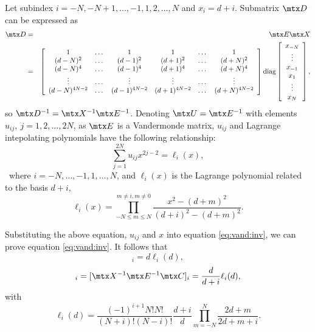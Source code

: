 Let subindex $i=-N,-N+1,\dots,-1,1,2,\dots,N$ and $x_i=d+i$.
Submatrix $\mtx D$ can be expressed as
\begin{eqnarray*}
\mtx D &=& \mtx E\mtx X \\
&=&
\left[\begin{array}{cccccc}
1 & \dots &1 &1 & \dots & 1 \\ 
(d-N)^2 & \dots & (d-1)^2 &(d+1)^2 & \dots & (d+N)^2 \\
(d-N)^4 & \dots & (d-1)^4 &(d+1)^4 & \dots & (d+N)^4 \\
\vdots & \dots & \vdots  & \vdots &\dots &\vdots \\
(d-N)^{4N-2} & \dots & (d-1)^{4N-2} & (d+1)^{4N-2} & \dots & (d+N)^{4N-2}
\end{array}\right]\textrm{diag}
\left[\begin{array}{c}
x_{-N}\\ \vdots \\ x_{-1} \\ x_1 \\ \vdots \\ x_N
\end{array}\right],
\end{eqnarray*}
so $\mtx D^{-1}=\mtx X^{-1}\mtx E^{-1}$.
Denoting $\mtx U=\mtx E^{-1}$ with elements $u_{ij},~j=1,2,\dots,2N$,
as $\mtx E$ is a Vandermonde matrix,
$u_{ij}$ and Lagrange intepolating polynomials have the following relationship:
\begin{equation}\label{eq:vand:inv}
\sum_{j=1}^{2N}u_{ij}x^{2j-2}=\ell_i(x),
\end{equation}\
where $i=-N,\dots,-1,1,\dots,N$, 
and $\ell_i(x)$ is the Lagrange polynomial related to the basis $d+i$,
\begin{equation}\label{eq:lag}
\ell_i(x)=
\prod_{-N\leq m\leq N}^{m\neq i,m\neq 0}
\frac{x^2-(d+m)^2}{(d+i)^2-(d+m)^2}.
\end{equation}

Substituting the above equation, $u_{ij}$ and $x$ 
into equation \ref{eq:vand:inv},
we can prove equation \ref{eq:vand:inv}.
It follows that
\begin{equation}
[\mtx E^{-1}\mtx C]_i=d\ell_i(d),
\end{equation}
\begin{equation}
[\mtx D^{-1}\mtx C]_i=
[\mtx X^{-1}\mtx E^{-1}\mtx C]_i=
\frac{d}{d+i}\ell_i(d),
\end{equation}
with
\begin{equation}
\ell_i(d)=\frac{(-1)^{i+1}N!N!}{(N+i)!(N-i)!}
\frac{d+i}{d}
\prod_{m=-N}^N \frac{2d+m}{2d+m+i}.
\end{equation}

